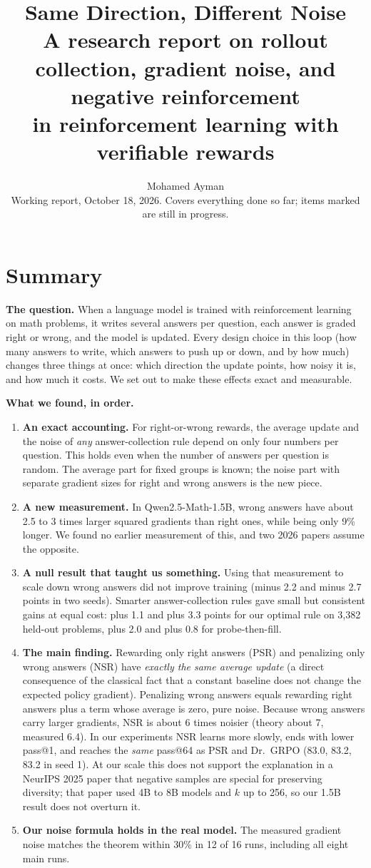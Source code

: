 \documentclass[11pt]{article}
\title{\textbf{Same Direction, Different Noise}\\[4pt]
\large A research report on rollout collection, gradient noise, and negative reinforcement\\ in reinforcement learning with verifiable rewards}
\author{Mohamed Ayman\\\small Working report, October 18, 2026. Covers everything done so far; items marked \status{running} are still in progress.}
\date{}
\begin{document}
\maketitle

\section*{Summary}

\textbf{The question.} When a language model is trained with reinforcement learning on math problems, it writes several answers per question, each answer is graded right or wrong, and the model is updated. Every design choice in this loop (how many answers to write, which answers to push up or down, and by how much) changes three things at once: which direction the update points, how noisy it is, and how much it costs. We set out to make these effects exact and measurable.

\textbf{What we found, in order.}
\begin{enumerate}[leftmargin=*,itemsep=2pt]
\item \textbf{An exact accounting.} For right-or-wrong rewards, the average update and the noise of \emph{any} answer-collection rule depend on only four numbers per question. This holds even when the number of answers per question is random. The average part for fixed groups is known; the noise part with separate gradient sizes for right and wrong answers is the new piece.
\item \textbf{A new measurement.} In Qwen2.5-Math-1.5B, wrong answers have about 2.5 to 3 times larger squared gradients than right ones, while being only 9\% longer. We found no earlier measurement of this, and two 2026 papers assume the opposite.
\item \textbf{A null result that taught us something.} Using that measurement to scale down wrong answers did not improve training (minus 2.2 and minus 2.7 points in two seeds). Smarter answer-collection rules gave small but consistent gains at equal cost: plus 1.1 and plus 3.3 points for our optimal rule on 3{,}382 held-out problems, plus 2.0 and plus 0.8 for probe-then-fill.
\item \textbf{The main finding.} Rewarding only right answers (PSR) and penalizing only wrong answers (NSR) have \emph{exactly the same average update} (a direct consequence of the classical fact that a constant baseline does not change the expected policy gradient). Penalizing wrong answers equals rewarding right answers plus a term whose average is zero, pure noise. Because wrong answers carry larger gradients, NSR is about 6 times noisier (theory about 7, measured 6.4). In our experiments NSR learns more slowly, ends with lower pass@1, and reaches the \emph{same} pass@64 as PSR and Dr.\ GRPO (83.0, 83.2, 83.2 in seed 1). At our scale this does not support the explanation in a NeurIPS 2025 paper that negative samples are special for preserving diversity; that paper used 4B to 8B models and $k$ up to 256, so our 1.5B result does not overturn it.
\item \textbf{Our noise formula holds in the real model.} The measured gradient noise matches the theorem within 30\% in 12 of 16 runs, including all eight main runs.
\end{enumerate}
\end{document}
